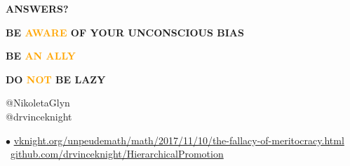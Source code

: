 \documentclass{beamer}
\begin{document}
\begin{frame}
    \centering
    \LARGE \textbf{ANSWERS?}
\end{frame}

\begin{frame}
    \centering
    \LARGE \textbf{BE \textcolor{orange}{AWARE} OF YOUR UNCONSCIOUS BIAS}
\end{frame}

\begin{frame}
    \centering
    \LARGE \textbf{BE \textcolor{orange}{AN ALLY}}
\end{frame}

\begin{frame}
    \centering
    \LARGE \textbf{DO \textcolor{orange}{NOT} BE LAZY}
\end{frame}

\begin{frame}
    \begin{center}
    @NikoletaGlyn \\
    @drvinceknight
    \vspace{1cm}
    \end{center}

    \footnotesize
    $\bullet$ \url{vknight.org/unpeudemath/math/2017/11/10/the-fallacy-of-meritocracy.html} \\
    \faGithub  \ \url{github.com/drvinceknight/HierarchicalPromotion}
\end{frame}
\end{document}
